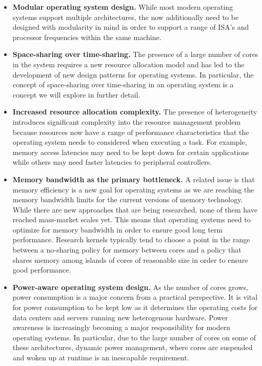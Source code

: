 \begin{itemize}
\item \textbf{Modular operating system design.} While most modern operating systems support multiple architectures, the now
additionally need to be designed with modularity in mind in order to support a range
of ISA's and processor frequencies within the same machine.
\item \textbf{Space-sharing over time-sharing.} The presence of a large number of cores in the system requires a new resource allocation model and has led to the development
of new design patterns for operating systems. In particular, the concept of space-sharing over time-sharing in an operating system is a concept we will explore in further
detail.
\item \textbf{Increased resource allocation complexity.} The presence of heterogeneity introduces significant complexity into the resource
management problem because resources now have a range of performance characteristics
that the operating system needs to considered when executing a task. For example, memory
access latencies may need to be kept down for certain applications while others may need
faster latencies to peripheral controllers.
\item \textbf{Memory bandwidth as the primary bottleneck.} A related issue is that memory efficiency is a new goal for operating systems as
we are reaching the memory bandwidth limits for the current versions of memory
technology. While there are new approaches that are being researched, none of them have
reached mass-market scales yet. This means that operating systems need to optimize for
memory bandwidth in order to ensure good long term performance. Research kernels
typically tend to choose a point in the range between a no-sharing policy for memory
between cores and a policy that shares memory among islands of cores of reasonable size
in order to ensure good performance.
\item \textbf{Power-aware operating system design.} As the number of cores grows, power consumption is a major concern from a
practical perspective. It is vital for power consumption to be kept low as it determines
the operating costs for data centers and servers running new heterogenous hardware.
Power awareness is increasingly becoming a major responsibility for modern operating
systems. In particular, due to the large number of cores on some of these architectures,
dynamic power management, where cores are suspended and woken up at runtime is an
inescapable requirement.
\end{itemize}

